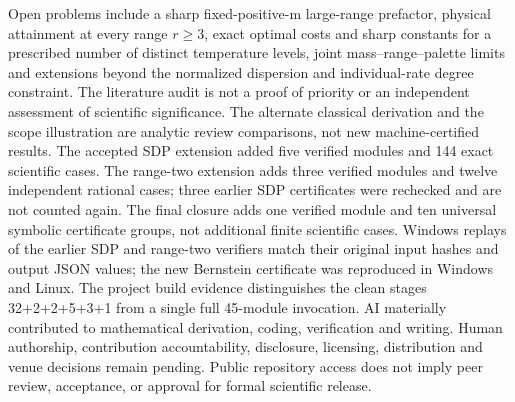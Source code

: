 \documentclass[11pt]{article}
\begin{document}
Open problems include a sharp fixed-positive-m large-range prefactor, physical attainment at every range $r\ge3$, exact optimal costs and sharp constants for a prescribed number of distinct temperature levels, joint mass--range--palette limits and extensions beyond the normalized dispersion and individual-rate degree constraint. The literature audit is not a proof of priority or an independent assessment of scientific significance. The alternate classical derivation and the scope illustration are analytic review comparisons, not new machine-certified results. The accepted SDP extension added five verified modules and 144 exact scientific cases. The range-two extension adds three verified modules and twelve independent rational cases; three earlier SDP certificates were rechecked and are not counted again. The final closure adds one verified module and ten universal symbolic certificate groups, not additional finite scientific cases. Windows replays of the earlier SDP and range-two verifiers match their original input hashes and output JSON values; the new Bernstein certificate was reproduced in Windows and Linux. The project build evidence distinguishes the clean stages 32+2+2+5+3+1 from a single full 45-module invocation. AI materially contributed to mathematical derivation, coding, verification and writing. Human authorship, contribution accountability, disclosure, licensing, distribution and venue decisions remain pending. Public repository access does not imply peer review, acceptance, or approval for formal scientific release.
\end{document}
